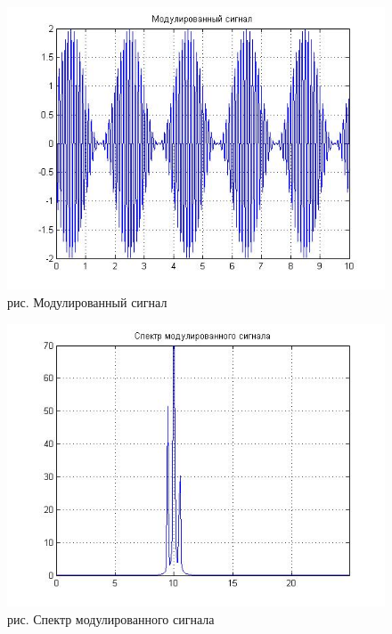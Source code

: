 \documentclass[10pt,a4paper]{report}
\begin{document}
\begin{figure}
\begin{center}
\includegraphics[angle=0, scale = 0.9]{7_3.jpg}\newline
рис. Модулированный сигнал\newline
\end{center}
\end{figure}
\begin{figure}
\begin{center}
\includegraphics[angle=0, scale = 0.9]{7_4.jpg}\newline
рис. Спектр модулированного сигнала\newline
\end{center}
\end{figure}
\end{document}
